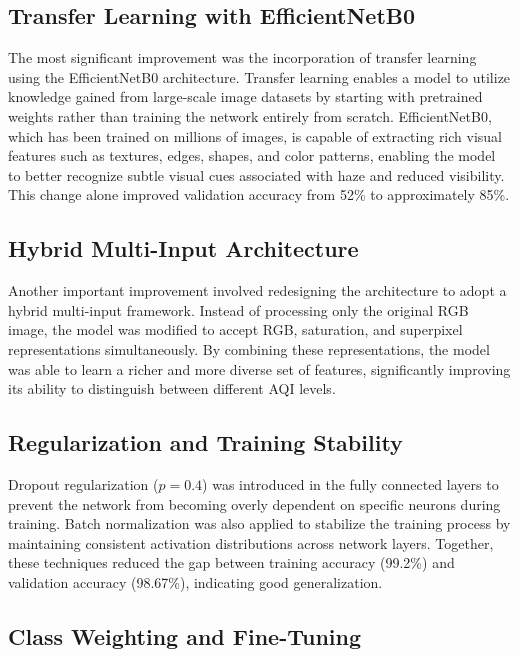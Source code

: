 \documentclass[conference]{IEEEtran}
\begin{document}
\subsection{Transfer Learning with EfficientNetB0}

The most significant improvement was the incorporation of transfer learning
using the EfficientNetB0 architecture. Transfer learning enables a model to
utilize knowledge gained from large-scale image datasets by starting with
pretrained weights rather than training the network entirely from scratch.
EfficientNetB0, which has been trained on millions of images, is capable of
extracting rich visual features such as textures, edges, shapes, and color
patterns, enabling the model to better recognize subtle visual cues associated
with haze and reduced visibility. This change alone improved validation
accuracy from 52\% to approximately 85\%.

\subsection{Hybrid Multi-Input Architecture}

Another important improvement involved redesigning the architecture to adopt
a hybrid multi-input framework. Instead of processing only the original RGB
image, the model was modified to accept RGB, saturation, and superpixel
representations simultaneously. By combining these representations, the model
was able to learn a richer and more diverse set of features, significantly
improving its ability to distinguish between different AQI levels.

\subsection{Regularization and Training Stability}

Dropout regularization ($p = 0.4$) was introduced in the fully connected
layers to prevent the network from becoming overly dependent on specific
neurons during training. Batch normalization was also applied to stabilize
the training process by maintaining consistent activation distributions across
network layers. Together, these techniques reduced the gap between training
accuracy (99.2\%) and validation accuracy (98.67\%), indicating good
generalization.

\subsection{Class Weighting and Fine-Tuning}
\end{document}
